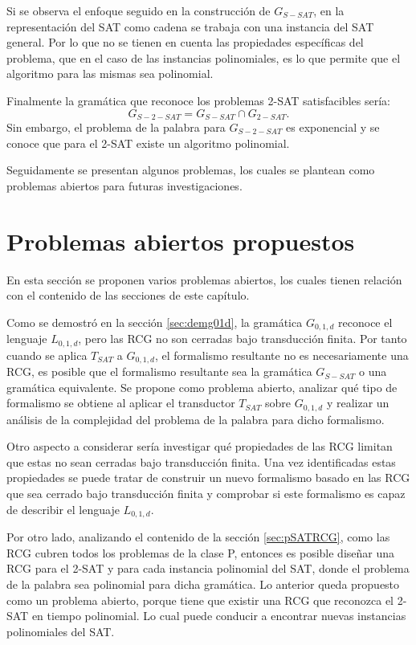 \documentclass[12pt]{article}
\begin{document}
Si se observa el enfoque seguido en la construcción de $G_{S-SAT}$, en la representación del SAT como cadena se trabaja con una instancia del SAT general. Por lo que no se tienen en cuenta las propiedades específicas del problema, que en el caso de las instancias polinomiales, es lo que permite que el algoritmo para las mismas sea polinomial.

Finalmente la gramática que reconoce los problemas 2-SAT satisfacibles sería:
$$G_{S-2-SAT}=G_{S-SAT}\cap G_{2-SAT}.$$
Sin embargo, el problema de la palabra para $G_{S-2-SAT}$ es exponencial y se conoce que para el 2-SAT existe un algoritmo polinomial.

Seguidamente se presentan algunos problemas, los cuales se plantean como problemas abiertos para futuras investigaciones.

\section{Problemas abiertos propuestos}

En esta sección se proponen varios problemas abiertos, los cuales tienen relación con el contenido de las secciones
de este capítulo.

Como se demostró en la sección \ref{sec:demg01d}, la gramática $G_{0,1,d}$ reconoce el lenguaje $L_{0,1,d}$, pero las RCG
no son cerradas bajo transducción finita. Por tanto cuando se aplica $T_{SAT}$ a $G_{0,1,d}$, el formalismo resultante 
no es necesariamente una RCG, es posible que el formalismo resultante sea la gramática $G_{S-SAT}$ o una gramática
equivalente. Se propone como problema abierto, analizar qué tipo de formalismo se obtiene al aplicar el transductor $T_{SAT}$
sobre $G_{0,1,d}$ y realizar un análisis de la complejidad del problema de la palabra para dicho formalismo. 

Otro aspecto a considerar sería investigar qué propiedades de las RCG limitan que estas no sean cerradas bajo transducción finita. 
Una vez identificadas estas propiedades se puede tratar de construir un nuevo formalismo basado en las RCG que sea cerrado bajo transducción finita y comprobar si este formalismo es capaz de describir el lenguaje $L_{0,1,d}$.

Por otro lado, analizando el contenido de la sección \ref{sec:pSATRCG}, como las RCG cubren todos los problemas de la clase P, entonces es posible diseñar una RCG para el 2-SAT y para cada instancia polinomial del SAT, donde el problema de la palabra sea polinomial para dicha gramática.
Lo anterior queda propuesto como un problema abierto, porque tiene que existir una RCG que reconozca el 2-SAT en tiempo polinomial.
Lo cual puede conducir a encontrar nuevas instancias polinomiales del SAT.
\end{document}
